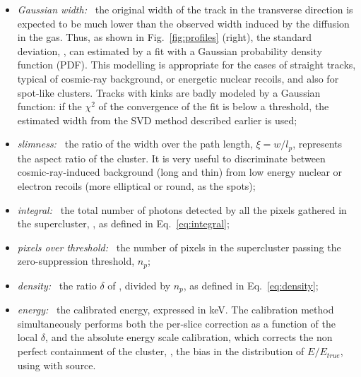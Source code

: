 \begin{itemize}
  \item \textit{Gaussian width:~} the original width of the track in
    the transverse direction is expected to be much lower than the
    observed width induced by the diffusion in the gas. Thus, as shown
    in Fig.~\ref{fig:profiles} (right), the standard
    deviation, \tsigmag, can estimated by a fit with a Gaussian
    probability density function (PDF). This modelling is appropriate
    for the cases of straight tracks, typical of cosmic-ray
    background, or energetic nuclear recoils, and also for spot-like
    clusters. Tracks with kinks are badly modeled by a Gaussian
    function: if the $\chi^2$ of the convergence of the fit is below a
    threshold, the estimated width from the SVD method described
    earlier is used;

  \item \textit{slimness:~} the ratio of the width over the path
    length, $\xi=w/l_p$, represents the aspect ratio of the
    cluster. It is very useful to discriminate between
    cosmic-ray-induced background (long and thin) from low energy
    nuclear or electron recoils (more elliptical or round, as the \fe
    spots);
    
  \item \textit{integral:~} the total number of photons detected by all the
  pixels gathered in the supercluster, \isclu, as defined in
  Eq.~\ref{eq:integral};

  \item \textit{pixels over threshold:~} the number of pixels in the
  supercluster passing the zero-suppression threshold, $n_p$;

  \item \textit{density:~} the ratio $\delta$ of \isclu, divided by
  $n_p$, as defined in Eq.~\ref{eq:density};

  \item \textit{energy:~} the calibrated energy, expressed in keV. The
    calibration method simultaneously performs both the per-slice
    correction as a function of the local $\delta$, and the absolute
    energy scale calibration, which corrects the non perfect
    containment of the cluster, \ie, the bias in the distribution of
    $E/E_{true}$, using with \fe source.
\end{itemize}


